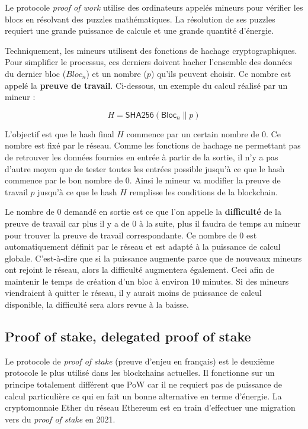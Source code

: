 Le protocole \textit{proof of work} utilise des ordinateurs appelés mineurs pour vérifier les blocs en résolvant des puzzles mathématiques. La résolution de ses puzzles requiert une grande puissance de calcule et une grande quantité d'énergie.

Techniquement, les mineurs utilisent des fonctions de hachage cryptographiques. Pour simplifier le processus, ces derniers doivent hacher l'ensemble des données du dernier bloc ($Bloc_n$) et un nombre ($p$) qu'ils peuvent choisir. Ce nombre est appelé la \textbf{preuve de travail}. Ci-dessous, un exemple du calcul réalisé par un mineur :

\begin{equation*}
    H = \textsf{SHA256}(\textsf{Bloc}_n \| p)
\end{equation*}

L'objectif est que le hash final $H$ commence par un certain nombre de 0. Ce nombre est fixé par le réseau. Comme les fonctions de hachage ne permettant pas de retrouver les données fournies en entrée à partir de la sortie, il n'y a pas d'autre moyen que de tester toutes les entrées possible jusqu'à ce que le hash commence par le bon nombre de 0. Ainsi le mineur va modifier la preuve de travail $p$ jusqu'à ce que le hash $H$ remplisse les conditions de la blockchain. 

Le nombre de 0 demandé en sortie est ce que l'on appelle la \textbf{difficulté} de la preuve de travail car plus il y a de 0 à la suite, plus il faudra de temps au mineur pour trouver la preuve de travail correspondante. Ce nombre de 0 est automatiquement définit par le réseau et est adapté à la puissance de calcul globale. C'est-à-dire que si la puissance augmente parce que de nouveaux mineurs ont rejoint le réseau, alors la difficulté augmentera également. Ceci afin de maintenir le temps de création d'un bloc à environ 10 minutes. Si des mineurs viendraient à quitter le réseau, il y aurait moins de puissance de calcul disponible, la difficulté sera alors revue à la baisse.

\subsection{Proof of stake, delegated proof of stake}
\label{consensus:pos}

Le protocole de \textit{proof of stake} (preuve d'enjeu en français) est le deuxième protocole le plus utilisé dans les blockchains actuelles. Il fonctionne sur un principe totalement différent que PoW car il ne requiert pas de puissance de calcul particulière ce qui en fait un bonne alternative en terme d'énergie. La cryptomonnaie Ether du réseau Ethereum est en train d'effectuer une migration vers du \textit{proof of stake} en 2021.

